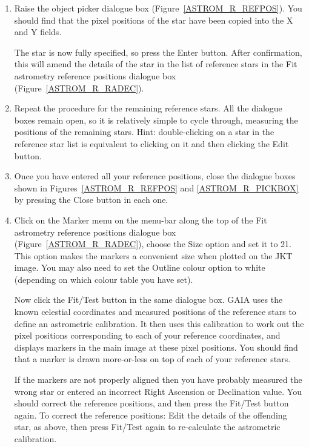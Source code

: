 \documentclass[twoside,11pt]{starlink}
\begin{document}
\begin{enumerate}
  \item Raise the object picker dialogue box (Figure~\ref{ASTROM_R_REFPOS}).
   You should find that the pixel positions of the star have been copied
   into the \textsf{X} and \textsf{Y} fields.

   The star is now fully specified, so press the \textsf{Enter} button.  After
   confirmation, this will amend the details of the star in the list of
   reference stars in the \textsf{Fit astrometry reference positions}
   dialogue box (Figure~\ref{ASTROM_R_RADEC}).

  \item Repeat the procedure for the remaining reference stars.  All the
   dialogue boxes remain open, so it is relatively simple to cycle through,
   measuring the positions of the remaining stars.  Hint: double-clicking
   on a star in the reference star list is equivalent to clicking on it
   and then clicking the \textsf{Edit} button.

  \item Once you have entered all your reference positions, close the
   dialogue boxes shown in Figures~\ref{ASTROM_R_REFPOS} and
   \ref{ASTROM_R_PICKBOX} by pressing the \textsf{Close} button in each
   one.

  \item Click on the \textsf{Marker} menu on the menu-bar along the top of
   the \textsf{Fit astrometry reference positions} dialogue box
   (Figure~\ref{ASTROM_R_RADEC}), choose the \textsf{Size} option and set it
   to \textsf{21}.  This option makes the markers a convenient size when
   plotted on the JKT image.  You may also need to set the \textsf{Outline
   colour} option to white (depending on which colour table you have set).

   Now click the \textsf{Fit/Test} button in the same dialogue box.
   GAIA uses the known celestial coordinates and measured positions of the
   reference stars to define an astrometric calibration.  It then uses this
   calibration to work out the pixel positions corresponding to each of
   your reference coordinates, and displays markers in the main image at
   these pixel positions. You should find that a marker is drawn
   more-or-less on top of each of your reference stars.

   If the markers are not properly aligned then you have probably measured
   the wrong star or entered an incorrect Right Ascension or Declination
   value.  You should correct the reference positions, and then press the
   \textsf{Fit/Test} button again.  To correct the reference positions:
   \textsf{Edit} the details of the offending star, as above, then press \textsf{Fit/Test} again to re-calculate the astrometric calibration.


\end{enumerate}
\end{document}
